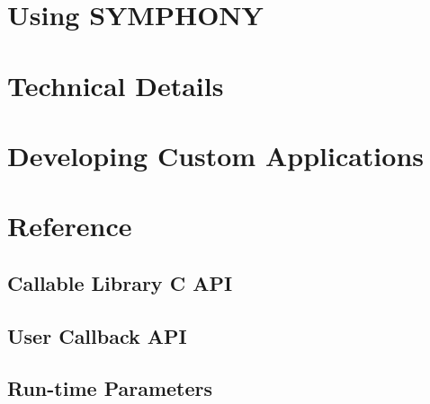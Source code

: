 \documentclass[twoside,11pt]{book}
\begin{document}
\chapter{Using SYMPHONY}
\label{API-overview}


\chapter{Technical Details}
\label{SYMPHONY-design}


\chapter{Developing Custom Applications}
\label{SYMPHONY-development}


\chapter{Reference}
\label{SYMPHONY-reference}

\section{Callable Library C API}
\label{callable-library}


\section{User Callback API}
\label{API}
\sloppy


\newpage



\newpage



\newpage



\newpage



\newpage

\section{Run-time Parameters}
\label{params}




\backmatter

\cleardoublepage
{}
{}



%


%


\cleardoublepage
{}
\printindex*
\end{document}
